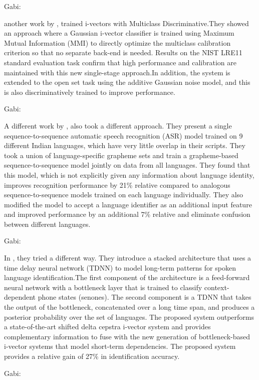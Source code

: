\documentclass[a4paper]{article}
\begin{document}
Gabi:

another work by \cite{alan2014multiclass}, trained i-vectors with Multiclass Discriminative.They showed an approach where a Gaussian i-vector classifier is trained using Maximum Mutual Information (MMI) to directly optimize the multiclass calibration criterion so that no separate back-end is needed. Results on the NIST LRE11 standard evaluation task confirm that high performance and calibration are maintained with this new single-stage approach.In addition, the system is
extended to the open set task using the additive Gaussian
noise model, and this is also discriminatively trained to
improve performance.

Gabi:

A different work by \cite{shubham2018multilingual}, also took a different approach. They present a single sequence-to-sequence automatic speech recognition (ASR) model trained on 9 different Indian languages, which have very little overlap in their scripts. They took a union of language-specific grapheme sets and train a grapheme-based sequence-to-sequence model jointly on data from all languages. They found that this model, which is not explicitly given any information about language identity, improves recognition performance by 21\% relative compared to analogous sequence-to-sequence models trained on each language individually. They also modified the model to accept a language identifier as an additional input feature and improved performance by an additional 7\% relative and eliminate confusion between different languages.

Gabi:

In \cite{daniel2016stacked}, they tried a different way. They introduce a stacked architecture that uses a time delay neural network (TDNN) to model long-term patterns for spoken language identification.The first component of the architecture is a feed-forward neural network with a bottleneck
layer that is trained to classify context-dependent phone states (senones). The second component is a TDNN that takes the
output of the bottleneck, concatenated over a long time span,
and produces a posterior probability over the set of languages. The proposed system outperforms a state-of-the-art shifted delta cepstra i-vector system and provides complementary information to fuse with the new generation of bottleneck-based i-vector systems that model short-term dependencies. The proposed system provides a relative gain of 27\% in identification accuracy.

Gabi:
\end{document}
